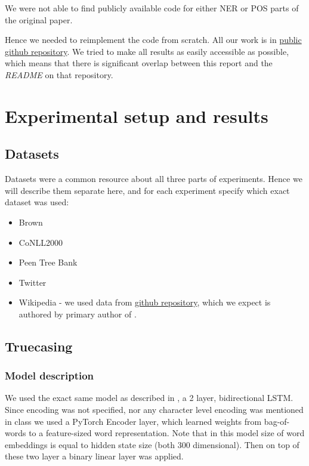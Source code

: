 \documentclass[11pt,a4paper]{article}
\begin{document}
We were not able to find publicly available code for either NER or POS parts of the original paper.

Hence we needed to reimplement the code from scratch. All our work is in \href{https://github.com/andreaskuster/uw-nlp}{public github repository}. We tried to make all results as easily accessible as possible, which means that there is significant overlap between this report and the \textit{README} on that repository.

\section{Experimental setup and results}

\subsection{Datasets}
Datasets were a common resource about all three parts of experiments. Hence we will describe them separate here, and for each experiment specify which exact dataset was used:
\begin{itemize}
    \item Brown
    \item CoNLL2000
    \item Peen Tree Bank
    \item Twitter
    \item Wikipedia - we used data from \href{https://github.com/raymondhs/char-rnn-truecase/tree/master/data/wiki}{github repository}, which we expect is authored by primary author of \cite{susanto-etal-2016-learning}.
\end{itemize}

\subsection{Truecasing}
\label{sec:exp-truecase}

    \subsubsection{Model description}
    We used the exact same model as described in \cite{susanto-etal-2016-learning}, a 2 layer, bidirectional LSTM. Since encoding was not specified, nor any character level encoding was mentioned in class we used a PyTorch \cite{pytorch} Encoder layer, which learned weights from bag-of-words to a feature-sized word representation. Note that in this model size of word embeddings is equal to hidden state size (both 300 dimensional). Then on top of these two layer a binary linear layer was applied.
\end{document}
